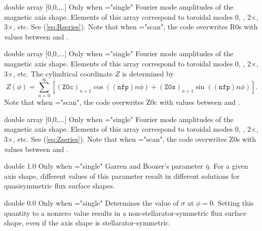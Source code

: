 \myhrule

{double array}
{[0,0,...]}
{Only when ={\ttfamily "single"}}
{Fourier mode amplitudes of the magnetic axis shape. Elements of this array correspond to toroidal modes 0, , 2$\times$, 3$\times$, etc. See (\ref{eq:Rseries}).
Note that when ={\ttfamily "scan"}, the code overwrites {\ttfamily R0s} with values between  and .
}

\myhrule

{double array}
{[0,0,...]}
{Only when ={\ttfamily "single"}}
{Fourier mode amplitudes of the magnetic axis shape. Elements of this array correspond to toroidal modes 0, , 2$\times$, 3$\times$, etc. The cylindrical coordinate $Z$ is determined by
\begin{equation}
Z(\phi) = \sum_{n=0}^{\infty} \left[ (\mathtt{Z0c})_{n+1} \cos((\mathtt{nfp})n \phi) +  (\mathtt{Z0s})_{n+1} \sin((\mathtt{nfp})n \phi)\right].
\label{eq:Zseries}
\end{equation}
Note that when ={\ttfamily "scan"}, the code overwrites {\ttfamily Z0c} with values between  and .
}

\myhrule

{double array}
{[0,0,...]}
{Only when ={\ttfamily "single"}}
{Fourier mode amplitudes of the magnetic axis shape. Elements of this array correspond to toroidal modes 0, , 2$\times$, 3$\times$, etc. See (\ref{eq:Zseries}).
Note that when ={\ttfamily "scan"}, the code overwrites {\ttfamily Z0s} with values between  and .
}

\myhrule

{double}
{1.0}
{Only when ={\ttfamily "single"}}
{Garren and Boozer's parameter $\bar{\eta}$. For a given axis shape, different values of this parameter result in different solutions for quasisymmetric flux surface shapes.
}

\myhrule

{double}
{0.0}
{Only when ={\ttfamily "single"}}
{Determines the value of $\sigma$ at $\phi=0$. Setting this quantity to a nonzero value results in a non-stellarator-symmetric flux surface shape, even if the axis shape is stellarator-symmetric.
}

